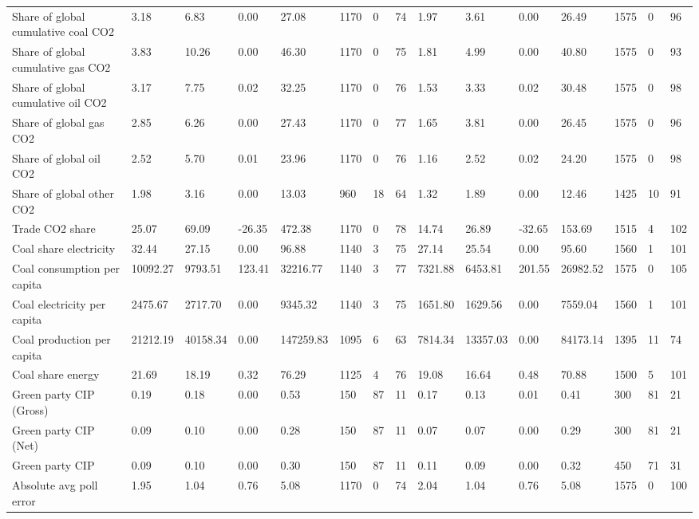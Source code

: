 \begin{longtable}{lllllllllllllll}
Share of global cumulative coal CO2 & 3.18 & 6.83 & 0.00 & 27.08 & 1170 & 0 & 74 & 1.97 & 3.61 & 0.00 & 26.49 & 1575 & 0 & 96\\
Share of global cumulative gas CO2 & 3.83 & 10.26 & 0.00 & 46.30 & 1170 & 0 & 75 & 1.81 & 4.99 & 0.00 & 40.80 & 1575 & 0 & 93\\
\addlinespace
Share of global cumulative oil CO2 & 3.17 & 7.75 & 0.02 & 32.25 & 1170 & 0 & 76 & 1.53 & 3.33 & 0.02 & 30.48 & 1575 & 0 & 98\\
Share of global gas CO2 & 2.85 & 6.26 & 0.00 & 27.43 & 1170 & 0 & 77 & 1.65 & 3.81 & 0.00 & 26.45 & 1575 & 0 & 96\\
Share of global oil CO2 & 2.52 & 5.70 & 0.01 & 23.96 & 1170 & 0 & 76 & 1.16 & 2.52 & 0.02 & 24.20 & 1575 & 0 & 98\\
Share of global other CO2 & 1.98 & 3.16 & 0.00 & 13.03 & 960 & 18 & 64 & 1.32 & 1.89 & 0.00 & 12.46 & 1425 & 10 & 91\\
Trade CO2 share & 25.07 & 69.09 & -26.35 & 472.38 & 1170 & 0 & 78 & 14.74 & 26.89 & -32.65 & 153.69 & 1515 & 4 & 102\\
\addlinespace
Coal share electricity & 32.44 & 27.15 & 0.00 & 96.88 & 1140 & 3 & 75 & 27.14 & 25.54 & 0.00 & 95.60 & 1560 & 1 & 101\\
Coal consumption per capita & 10092.27 & 9793.51 & 123.41 & 32216.77 & 1140 & 3 & 77 & 7321.88 & 6453.81 & 201.55 & 26982.52 & 1575 & 0 & 105\\
Coal electricity per capita & 2475.67 & 2717.70 & 0.00 & 9345.32 & 1140 & 3 & 75 & 1651.80 & 1629.56 & 0.00 & 7559.04 & 1560 & 1 & 101\\
Coal production per capita & 21212.19 & 40158.34 & 0.00 & 147259.83 & 1095 & 6 & 63 & 7814.34 & 13357.03 & 0.00 & 84173.14 & 1395 & 11 & 74\\
Coal share energy & 21.69 & 18.19 & 0.32 & 76.29 & 1125 & 4 & 76 & 19.08 & 16.64 & 0.48 & 70.88 & 1500 & 5 & 101\\
\addlinespace
Green party CIP (Gross) & 0.19 & 0.18 & 0.00 & 0.53 & 150 & 87 & 11 & 0.17 & 0.13 & 0.01 & 0.41 & 300 & 81 & 21\\
Green party CIP (Net) & 0.09 & 0.10 & 0.00 & 0.28 & 150 & 87 & 11 & 0.07 & 0.07 & 0.00 & 0.29 & 300 & 81 & 21\\
Green party CIP & 0.09 & 0.10 & 0.00 & 0.30 & 150 & 87 & 11 & 0.11 & 0.09 & 0.00 & 0.32 & 450 & 71 & 31\\
Absolute avg poll error & 1.95 & 1.04 & 0.76 & 5.08 & 1170 & 0 & 74 & 2.04 & 1.04 & 0.76 & 5.08 & 1575 & 0 & 100\\

\end{longtable}
